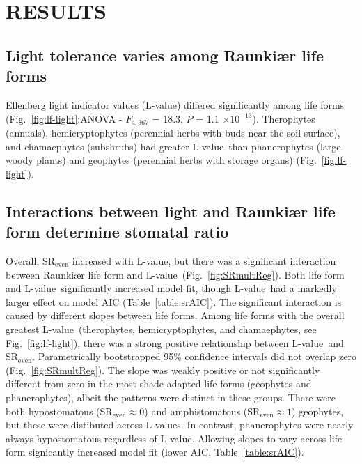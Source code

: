 \documentclass[12pt, oneside]{article}
\newcommand{\el}{L-value}
\begin{document}

\section*{RESULTS}

\subsection*{Light tolerance varies among Raunki\ae r life forms}

Ellenberg light indicator values (\el) differed significantly among life forms (Fig.~\ref{fig:lf-light};ANOVA - $F_{4, 367}$ = 18.3, $P$ = 1.1 $\times10^{-13}$). Therophytes (annuals), hemicryptophytes (perennial herbs with buds near the soil surface), and chamaephytes (subshrubs) had greater \el~than phanerophytes (large woody plants) and geophytes (perennial herbs with storage organs) (Fig.~\ref{fig:lf-light}).

\subsection*{Interactions between light and Raunki\ae r life form determine stomatal ratio}

Overall, $\mathrm{SR_{even}}$ increased with \el, but there was a significant interaction between Raunki\ae r life form and \el~(Fig.~\ref{fig:SRmultReg}). Both life form and \el~significantly increased model fit, though \el~had a markedly larger effect on model AIC (Table~\ref{table:srAIC}). The significant interaction is caused by different slopes between life forms. Among life forms with the overall greatest \el~(therophytes, hemicryptophytes, and chamaephytes, see Fig.~\ref{fig:lf-light}), there was a strong positive relationship between \el~and $\mathrm{SR_{even}}$. Parametrically bootstrapped 95\% confidence intervals did not overlap zero (Fig.~\ref{fig:SRmultReg}). The slope was weakly positive or not significantly different from zero in the most shade-adapted life forms (geophytes and phanerophytes), albeit the patterns were distinct in these groups. There were both hypostomatous ($\mathrm{SR_{even}} \approx 0$) and amphistomatous ($\mathrm{SR_{even}} \approx 1$) geophytes, but these were distibuted across \el s. In contrast, phanerophytes were nearly always hypostomatous regardless of \el. Allowing slopes to vary across life form signicantly increased model fit (lower AIC, Table~\ref{table:srAIC}).
\end{document}
